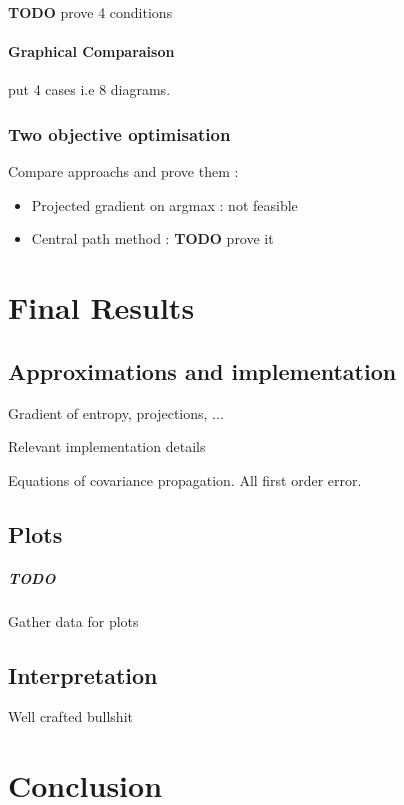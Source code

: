 \documentclass[10pt]{report}
\theoremstyle{plain}
\theoremstyle{definition}
\theoremstyle{remark}
\newcommand{\TODO}{\textbf{TODO}}
\begin{document}
\TODO{} prove 4 conditions

\subsubsection{Graphical Comparaison}

put 4 cases i.e 8 diagrams.

\subsection{Two objective optimisation}

Compare approachs and prove them :
\begin{itemize}
  \item Projected gradient on argmax : not feasible
  \item Central path method : \TODO{} prove it
\end{itemize}

\chapter{Final Results}

\section{Approximations and implementation}

Gradient of entropy, projections, ...

Relevant implementation details

Equations of covariance propagation. All first order error.

\section{Plots}

\paragraph{TODO} Gather data for plots

\section{Interpretation}

Well crafted bullshit

\chapter*{Conclusion} %
\end{document}
